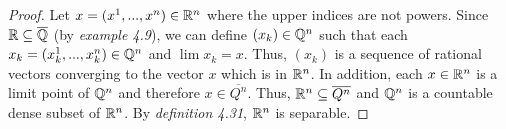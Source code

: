 \begin{questions}


\begin{solution}
  \begin{proof}
Let $x=(x^1,...,x^n)\in\mathbb{R}^n$ where the upper indices are not powers. Since $\mathbb{R}\subseteq\overline{\mathbb{Q}}$ (by \textit{example 4.9}), we can define $(x_k)\in\mathbb{Q}^n$ such that each $x_k=(x^1_k,...,x^n_k)\in\mathbb{Q}^n$ and $\lim x_k=x$. Thus, $(x_k)$ is a sequence of rational vectors converging to the vector $x$ which is in $\mathbb{R}^n$. In addition, each $x\in\mathbb{R}^n$ is a limit point of $\mathbb{Q}^n$ and therefore $x\in\overline{Q^n}$.
Thus, $\mathbb{R}^n\subseteq\overline{Q^n}$ and $\mathbb{Q}^n$ is a countable dense subset of $\mathbb{R}^n$. By \textit{definition 4.31}, $\mathbb{R}^n$ is separable.
  \end{proof}
\end{solution}


\end{questions}